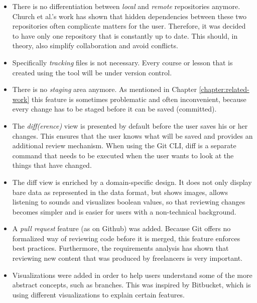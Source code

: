 \begin{itemize}
  \item There is no differentiation between \textit{local} and \textit{remote} repositories anymore. Church et al.'s \cite{church_case_2014} work has shown that hidden dependencies between these two repositories often complicate matters for the user. Therefore, it was decided to have only one repository that is constantly up to date. This should, in theory, also simplify collaboration and avoid conflicts.
  \item Specifically \emph{tracking} files is not necessary. Every course or lesson that is created using the tool will be under version control.
  \item There is no \emph{staging} area anymore. As mentioned in Chapter \ref{chapter:related-work} this feature is sometimes problematic and often inconvenient, because every change has to be staged before it can be saved (committed).
  \item The \emph{diff(erence)} view is presented by default before the user saves his or her changes. This ensures that the user knows what will be saved and provides an additional review mechanism. When using the Git CLI, diff is a separate command that needs to be executed when the user wants to look at the things that have changed.
  \item The diff view is enriched by a domain-specific design. It does not only display bare data as represented in the data format, but shows images, allows listening to sounds and visualizes boolean values, so that reviewing changes becomes simpler and is easier for users with a non-technical background.
  \item A \emph{pull request} feature (as on Github) was added. Because Git offers no formalized way of reviewing code before it is merged, this feature enforces best practices. Furthermore, the requirements analysis has shown that reviewing new content that was produced by freelancers is very important.
  \item Visualizations were added in order to help users understand some of the more abstract concepts, such as branches. This was inspired by Bitbucket, which is using different visualizations to explain certain features.
\end{itemize}

